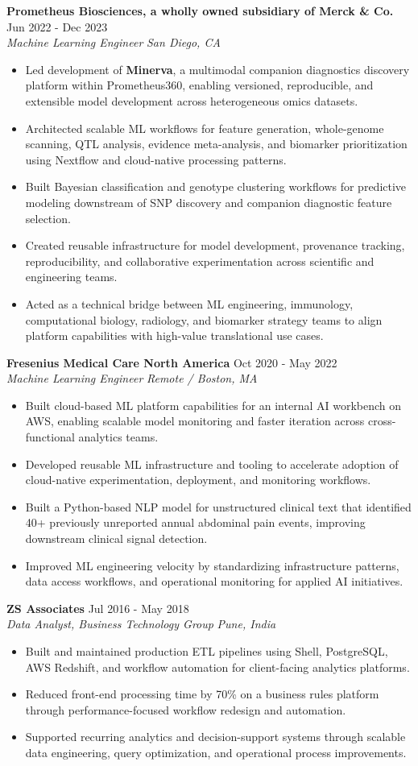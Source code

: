 \documentclass[10pt,letterpaper]{article}
\newcommand{\role}[4]{%
  \textbf{#1} \hfill #2\\
  \textit{#3} \hfill \textit{#4}\vspace{2pt}
}
\newcommand{\resumelist}{\begin{itemize}\setlength{\itemsep}{1.2pt}\setlength{\parskip}{0pt}\setlength{\parsep}{0pt}}
\newcommand{\resumelistend}{\end{itemize}}
\begin{document}
\role{Prometheus Biosciences, a wholly owned subsidiary of Merck \& Co.}{Jun 2022 - Dec 2023}{Machine Learning Engineer}{San Diego, CA}
\resumelist
  \item Led development of \textbf{Minerva}, a multimodal companion diagnostics discovery platform within Prometheus360, enabling versioned, reproducible, and extensible model development across heterogeneous omics datasets.
  \item Architected scalable ML workflows for feature generation, whole-genome scanning, QTL analysis, evidence meta-analysis, and biomarker prioritization using Nextflow and cloud-native processing patterns.
  \item Built Bayesian classification and genotype clustering workflows for predictive modeling downstream of SNP discovery and companion diagnostic feature selection.
  \item Created reusable infrastructure for model development, provenance tracking, reproducibility, and collaborative experimentation across scientific and engineering teams.
  \item Acted as a technical bridge between ML engineering, immunology, computational biology, radiology, and biomarker strategy teams to align platform capabilities with high-value translational use cases.
\resumelistend

\role{Fresenius Medical Care North America}{Oct 2020 - May 2022}{Machine Learning Engineer}{Remote / Boston, MA}
\resumelist
  \item Built cloud-based ML platform capabilities for an internal AI workbench on AWS, enabling scalable model monitoring and faster iteration across cross-functional analytics teams.
  \item Developed reusable ML infrastructure and tooling to accelerate adoption of cloud-native experimentation, deployment, and monitoring workflows.
  \item Built a Python-based NLP model for unstructured clinical text that identified 40+ previously unreported annual abdominal pain events, improving downstream clinical signal detection.
  \item Improved ML engineering velocity by standardizing infrastructure patterns, data access workflows, and operational monitoring for applied AI initiatives.
\resumelistend

\role{ZS Associates}{Jul 2016 - May 2018}{Data Analyst, Business Technology Group}{Pune, India}
\resumelist
  \item Built and maintained production ETL pipelines using Shell, PostgreSQL, AWS Redshift, and workflow automation for client-facing analytics platforms.
  \item Reduced front-end processing time by 70\% on a business rules platform through performance-focused workflow redesign and automation.
  \item Supported recurring analytics and decision-support systems through scalable data engineering, query optimization, and operational process improvements.
\resumelistend
\end{document}
